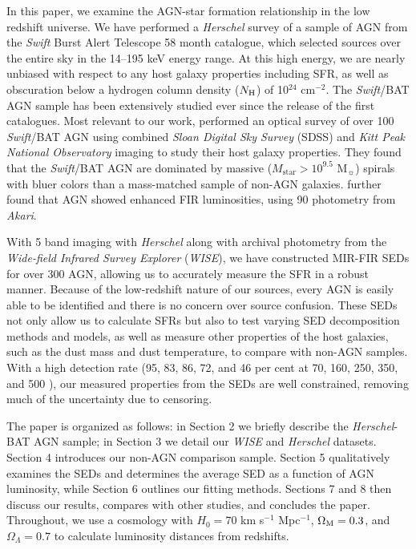\documentclass[fleqn, usenatbib]{mnras}
\newcommand{\herschel}{\emph{Herschel}}
\newcommand{\swift}{\textit{Swift}}
\newcommand{\msun}{M$_{\sun}$}
\newcommand{\mstar}{$M_{\mathrm{star}}$}
\begin{document}
In this paper, we examine the AGN-star formation relationship in the low redshift universe. We have performed a \herschel{} survey of a sample of AGN from the \textit{Swift} Burst Alert Telescope 58 month catalogue, which selected sources over the entire sky in the 14--195 keV energy range. At this high energy, we are nearly unbiased with respect to any host galaxy properties including SFR, as well as obscuration below a hydrogen column density ($N_{\rm H}$) of 10$^{24}$ cm$^{-2}$. The \swift/BAT AGN sample has been extensively studied ever since the release of the first catalogues. Most relevant to our work, \citet{Koss:2011vn} performed an optical survey of over 100 \swift/BAT AGN using combined \textit{Sloan Digital Sky Survey} (SDSS) and \textit{Kitt Peak National Observatory} imaging to study their host galaxy properties. They found that the \swift/BAT AGN are dominated by massive (\mstar $> 10^{9.5}$ \msun) spirals with bluer colors than a mass-matched sample of non-AGN galaxies. \citet{Koss:2011vn} further found that AGN showed enhanced FIR luminosities, using 90 \micron{} photometry from \textit{Akari}. 

With 5 band imaging with \herschel{} along with archival photometry from the \textit{Wide-field Infrared Survey Explorer} (\textit{WISE}), we have constructed MIR-FIR SEDs for over 300 AGN, allowing us to accurately measure the SFR in a robust manner. Because of the low-redshift nature of our sources, every AGN is easily able to be identified and there is no concern over source confusion. These SEDs not only allow us to calculate SFRs but also to test varying SED decomposition methods and models, as well as measure other properties of the host galaxies, such as the dust mass and dust temperature, to compare with non-AGN samples. With a high detection rate (95, 83, 86, 72, and 46 per cent at 70, 160, 250, 350, and 500 \micron), our measured properties from the SEDs are well constrained, removing much of the uncertainty due to censoring. 

The paper is organized as follows: in Section 2 we briefly describe the \herschel-BAT AGN sample; in Section 3 we detail our \textit{WISE} and \herschel{} datasets. Section 4 introduces our non-AGN comparison sample. Section 5 qualitatively examines the SEDs and determines the average SED as a function of AGN luminosity, while Section 6 outlines our fitting methods. Sections 7 and 8 then discuss our results, compares with other studies, and concludes the paper. Throughout, we use a cosmology with $H_{0}=70$ km s$^{-1}$ Mpc$^{-1}$, $\Omega_{\rm M}=0.3$, and $\Omega_{\Lambda} = 0.7$ to calculate luminosity distances from redshifts. 
\end{document}
